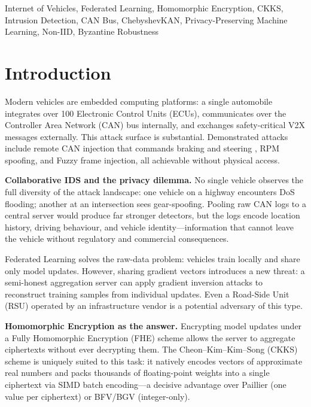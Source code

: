 \documentclass[conference]{IEEEtran}
\begin{document}
\begin{IEEEkeywords}
Internet of Vehicles, Federated Learning, Homomorphic Encryption, CKKS,
Intrusion Detection, CAN Bus, ChebyshevKAN, Privacy-Preserving Machine
Learning, Non-IID, Byzantine Robustness
\end{IEEEkeywords}

\section{Introduction}

Modern vehicles are embedded computing platforms: a single automobile
integrates over 100 Electronic Control Units (ECUs), communicates over the
Controller Area Network (CAN) bus internally, and exchanges safety-critical
V2X messages externally. This attack surface is substantial. Demonstrated
attacks include remote CAN injection that commands braking and steering
\cite{miller2015remote}, RPM spoofing, and Fuzzy frame injection, all
achievable without physical access.

\textbf{Collaborative IDS and the privacy dilemma.}
No single vehicle observes the full diversity of the attack landscape: one
vehicle on a highway encounters DoS flooding; another at an intersection sees
gear-spoofing. Pooling raw CAN logs to a central server would produce
far stronger detectors, but the logs encode location history, driving
behaviour, and vehicle identity---information that cannot leave the vehicle
without regulatory and commercial consequences.

Federated Learning \cite{mcmahan2017fl} solves the raw-data problem: vehicles
train locally and share only model updates. However, sharing gradient
vectors introduces a new threat: a semi-honest aggregation server can apply
gradient inversion attacks \cite{zhu2019deep} to reconstruct training
samples from individual updates. Even a Road-Side Unit (RSU) operated by an
infrastructure vendor is a potential adversary of this type.

\textbf{Homomorphic Encryption as the answer.}
Encrypting model updates under a Fully Homomorphic Encryption (FHE) scheme
allows the server to aggregate ciphertexts without ever decrypting them.
The Cheon--Kim--Kim--Song (CKKS) scheme \cite{ckks2017} is uniquely suited
to this task: it natively encodes vectors of approximate real numbers and
packs thousands of floating-point weights into a single ciphertext via SIMD
batch encoding---a decisive advantage over Paillier (one value per ciphertext)
or BFV/BGV (integer-only).
\end{document}
